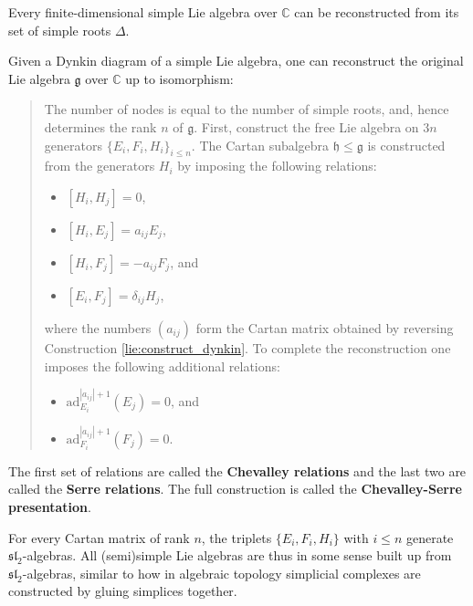     \begin{theorem}
        Every finite-dimensional simple Lie algebra over $\mathbb{C}$ can be reconstructed from its set of simple roots $\Delta$.
    \end{theorem}
    \begin{construct}\label{lie:reconstruction}
        Given a Dynkin diagram of a simple Lie algebra, one can reconstruct the original Lie algebra $\mathfrak{g}$ over $\mathbb{C}$ up to isomorphism:
        \begin{quote}
            The number of nodes is equal to the number of simple roots, and, hence determines the rank $n$ of $\mathfrak{g}$. First, construct the free Lie algebra on $3n$ generators $\{E_i,F_i,H_i\}_{i\leq n}$. The Cartan subalgebra $\mathfrak{h}\leq\mathfrak{g}$ is constructed from the generators $H_i$ by imposing the following relations:
            \begin{itemize}
                \item $[H_i,H_j] = 0$,
                \item $[H_i,E_j] = a_{ij}E_j$,
                \item $[H_i,F_j] = -a_{ij}F_j$, and
                \item $[E_i,F_j] = \delta_{ij}H_j$,
            \end{itemize}
            where the numbers $(a_{ij})$ form the Cartan matrix obtained by reversing Construction \ref{lie:construct_dynkin}. To complete the reconstruction one imposes the following additional relations:
            \begin{itemize}
                \item $\mathrm{ad}_{E_i}^{|a_{ij}|+1}(E_j) = 0$, and
                \item $\mathrm{ad}_{F_i}^{|a_{ij}|+1}(F_j) = 0$.
            \end{itemize}
        \end{quote}
        The first set of relations are called the \textbf{Chevalley relations} and the last two are called the \textbf{Serre relations}. The full construction is called the \textbf{Chevalley-Serre presentation}.
    \end{construct}

    \begin{property}[$\mathfrak{sl}_2$]
        For every Cartan matrix of rank $n$, the triplets $\{E_i,F_i,H_i\}$ with $i\leq n$ generate $\mathfrak{sl}_2$-algebras. All (semi)simple Lie algebras are thus in some sense built up from $\mathfrak{sl}_2$-algebras, similar to how in algebraic topology simplicial complexes are constructed by gluing simplices together.
    \end{property}

